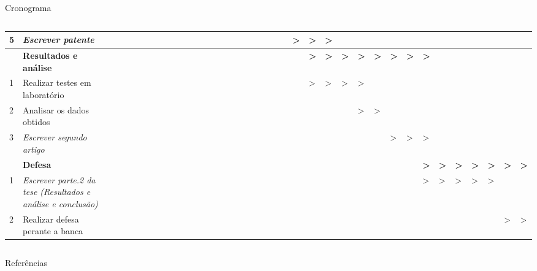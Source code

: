 \begin{frame}[c]{Cronograma}
\begin{columns}
\begin{table}[]
\begin{tabular}{llllllllllllll|llllllllllll|llllllllllll}
    5 & {\color[HTML]{3166FF} \textit{Escrever patente}} &  &  &  &  &  &  &  &  &  &  &  &  &  &  &  &  &  &  &  &  &  & \textgreater{} & \textgreater{} & \textgreater{} &  &  &  &  &  &  &  &  &  &  &  &  \\ \hline
     & \textbf{Resultados e análise} &  &  &  &  &  &  &  &  &  &  &  &  &  &  &  &  &  &  &  &  &  &  & \textbf{\textgreater{}} & \textbf{\textgreater{}} & \textbf{\textgreater{}} & \textbf{\textgreater{}} & \textbf{\textgreater{}} & \textbf{\textgreater{}} & \textbf{\textgreater{}} & \textbf{\textgreater{}} &  &  &  &  &  &  \\ \hline
    1 & Realizar testes em laboratório &  &  &  &  &  &  &  &  &  &  &  &  &  &  &  &  &  &  &  &  &  &  & \textgreater{} & \textgreater{} & \textgreater{} & \textgreater{} &  &  &  &  &  &  &  &  &  &  \\
    2 & Analisar os dados obtidos &  &  &  &  &  &  &  &  &  &  &  &  &  &  &  &  &  &  &  &  &  &  &  &  &  & \textgreater{} & \textgreater{} &  &  &  &  &  &  &  &  &  \\
    3 & {\color[HTML]{3166FF} \textit{Escrever segundo artigo}} &  &  &  &  &  &  &  &  &  &  &  &  &  &  &  &  &  &  &  &  &  &  &  &  &  &  &  & \textgreater{} & \textgreater{} & \textgreater{} &  &  &  &  &  &  \\ \hline
     & \textbf{Defesa} &  &  &  &  &  &  &  &  &  &  &  &  &  &  &  &  &  &  &  &  &  &  &  &  &  &  &  &  &  & \textbf{\textgreater{}} & \textbf{\textgreater{}} & \textbf{\textgreater{}} & \textbf{\textgreater{}} & \textbf{\textgreater{}} & \textbf{\textgreater{}} & \textbf{\textgreater{}} \\ \hline
    1 & {\color[HTML]{3166FF} \textit{Escrever parte.2 da tese (Resultados e análise e conclusão)}} &  &  &  &  &  &  &  &  &  &  &  &  &  &  &  &  &  &  &  &  &  &  &  &  &  &  &  &  &  & \textgreater{} & \textgreater{} & \textgreater{} & \textgreater{} & \textgreater{} &  &  \\
    2 & {\color[HTML]{9A0000} Realizar defesa perante a banca} &  &  &  &  &  &  &  &  &  &  &  &  &  &  &  &  &  &  &  &  &  &  &  &  &  &  &  &  &  &  &  &  &  &  & \textgreater{} & \textgreater{}
    \end{tabular}
    \end{table}
    \end{columns}

\end{frame}
\begin{frame}[c]{Referências}
    \centering
    
\end{frame}
